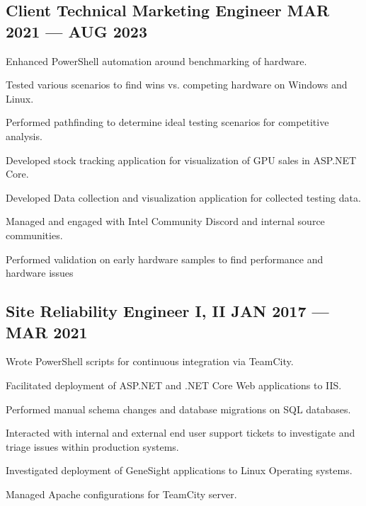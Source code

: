 \subsection{{Client Technical Marketing Engineer \hfill MAR 2021 --- AUG 2023}}
\begin{zitemize}
\item Enhanced PowerShell automation around benchmarking of hardware.
\item Tested various scenarios to find wins vs. competing hardware on Windows and Linux.
\item Performed pathfinding to determine ideal testing scenarios for competitive analysis.
\item Developed stock tracking application for visualization of GPU sales in ASP.NET Core.
\item Developed Data collection and visualization application for collected testing data.
\item Managed and engaged with Intel Community Discord and internal source communities.
\item Performed validation on early hardware samples to find performance and hardware issues
\end{zitemize}

\subsection{{Site Reliability Engineer I, II \hfill JAN 2017 --- MAR 2021}}
\begin{zitemize}
\item Wrote PowerShell scripts for continuous integration via TeamCity.
\item Facilitated deployment of ASP.NET and .NET Core Web applications to IIS.
\item Performed manual schema changes and database migrations on SQL databases.
\item Interacted with internal and external end user support tickets to investigate and triage issues within production systems.
\item Investigated deployment of GeneSight applications to Linux Operating systems.
\item Managed Apache configurations for TeamCity server.
\end{zitemize}

